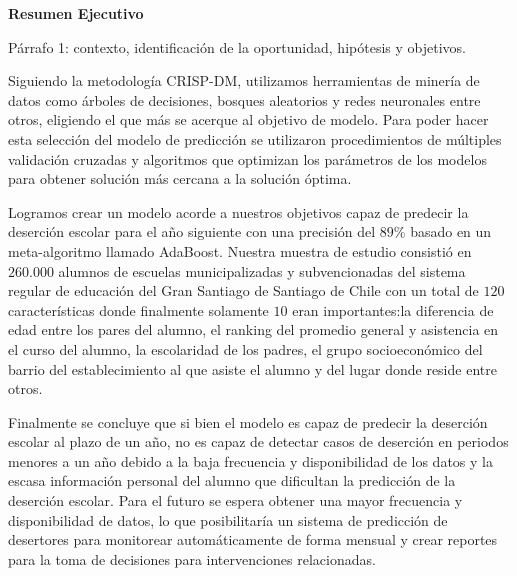     \begin{center}
        \vspace*{1cm}
        
        \textbf{Resumen Ejecutivo}
        
        \vspace{0.5cm}
        
    \end{center}


Párrafo 1: contexto, identificación de la oportunidad, hipótesis y objetivos.

Siguiendo la metodología CRISP-DM, utilizamos herramientas de minería de datos como árboles de decisiones, bosques aleatorios y redes neuronales entre otros, eligiendo el que más se acerque al objetivo de modelo. Para poder hacer esta selección del modelo de predicción se utilizaron procedimientos de múltiples validación cruzadas y algoritmos que optimizan los parámetros de los modelos para obtener solución más cercana a la solución óptima.

Logramos crear un modelo acorde a nuestros objetivos capaz de predecir la deserción escolar para el año siguiente con una precisión del $89$\% basado en un meta-algoritmo llamado AdaBoost. Nuestra muestra de estudio consistió en $260.000$ alumnos de escuelas municipalizadas y subvencionadas del sistema regular de educación del Gran Santiago de Santiago de Chile con un total de $120$ características donde finalmente solamente $10$ eran importantes:la diferencia de edad entre los pares del alumno, el ranking del promedio general y asistencia en el curso del alumno, la escolaridad de los padres, el grupo socioeconómico del barrio del establecimiento al que asiste el alumno y del lugar donde reside entre otros. 

Finalmente se concluye que si bien el modelo es capaz de predecir la deserción escolar al plazo de un año, no es capaz de detectar casos de deserción en periodos menores a un año debido a la baja frecuencia y disponibilidad de los datos y la escasa información personal del alumno que dificultan la predicción de la deserción escolar. Para el futuro se espera obtener una mayor frecuencia y disponibilidad de datos, lo que posibilitaría un sistema de predicción de desertores para monitorear automáticamente de forma mensual y crear reportes para la toma de decisiones para intervenciones relacionadas.
